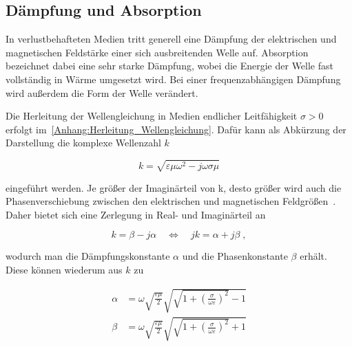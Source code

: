 \subsection{Dämpfung und Absorption}\label{cha:2_sub_Daempfung_und_Absorption}


In verlustbehafteten Medien tritt generell eine Dämpfung der elektrischen und magnetischen Feldstärke einer sich ausbreitenden Welle auf. Absorption bezeichnet dabei eine sehr starke Dämpfung, wobei die Energie der Welle fast vollständig in Wärme umgesetzt wird. Bei einer frequenzabhängigen Dämpfung wird außerdem die Form der Welle verändert. 
\par
\vspace{\linespace}
Die Herleitung der Wellengleichung in Medien endlicher Leitfähigkeit $\sigma > 0$ erfolgt im~\Anhang \ref{Anhang:Herleitung_Wellengleichung}. Dafür kann als Abkürzung der Darstellung die komplexe Wellenzahl $k$

\begin{equation}
    k = \sqrt{\varepsilon \mu \omega^2 - j \omega \sigma \mu}
\end{equation}

eingeführt werden. Je größer der Imaginärteil von k, desto größer wird auch die Phasenverschiebung zwischen den elektrischen und magnetischen Feldgrößen~\cite{EM_Schirmung}. Daher bietet sich eine Zerlegung in Real- und Imaginärteil an

\begin{equation}
    k = \beta - j \alpha \quad \Leftrightarrow \quad jk = \alpha + j\beta \; ,
\end{equation}

wodurch man die Dämpfungskonstante $\alpha$ und die Phasenkonstante $\beta$ erhält. Diese können wiederum aus $k$ zu

\begin{align}
    \alpha &= \omega \sqrt{\frac{\varepsilon \mu}{2}} \sqrt{\sqrt{1+\left(\frac{\sigma}{\omega\varepsilon}\right)^2}-1} \\
    \beta &= \omega \sqrt{\frac{\varepsilon \mu}{2}} \sqrt{\sqrt{1+\left(\frac{\sigma}{\omega\varepsilon}\right)^2}+1}
\end{align}

